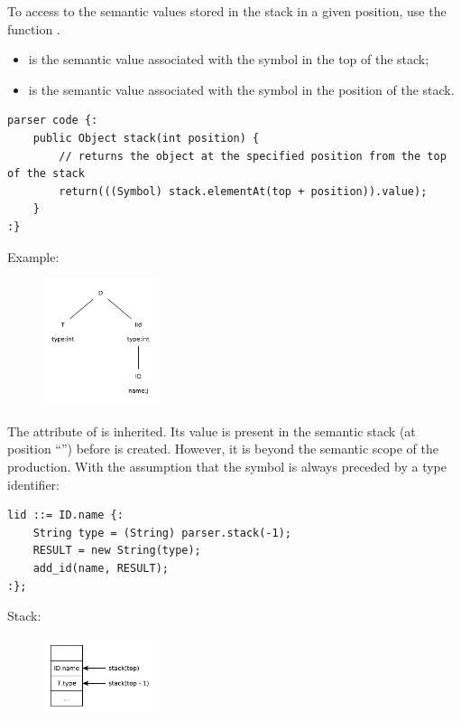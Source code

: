 To access to the semantic values stored in the stack in a given position, use the function .
\begin{itemize}
    \item
     is the semantic value associated with the symbol in the top of the stack;
    \item
     is the semantic value associated with the symbol in the position  of the stack.
\end{itemize}

\begin{lstlisting}
parser code {:
    public Object stack(int position) {
        // returns the object at the specified position from the top of the stack
        return(((Symbol) stack.elementAt(top + position)).value);
    }
:}
\end{lstlisting}

Example:
\begin{figure}[H]
    \centerline{\includegraphics[width=0.3\textwidth]{img/34.pdf}}
\end{figure}
The  attribute of  is inherited.
Its value is present in the semantic stack (at position ``'') before  is created.
However, it is beyond the semantic scope of the  production.
With the assumption that the  symbol is always preceded by a type identifier:
\begin{lstlisting}
lid ::= ID.name {:
    String type = (String) parser.stack(-1);
    RESULT = new String(type);
    add_id(name, RESULT);
:};
\end{lstlisting}
Stack:
\begin{figure}[H]
    \centerline{\includegraphics[width=0.3\textwidth]{img/33.pdf}} %
\end{figure}

